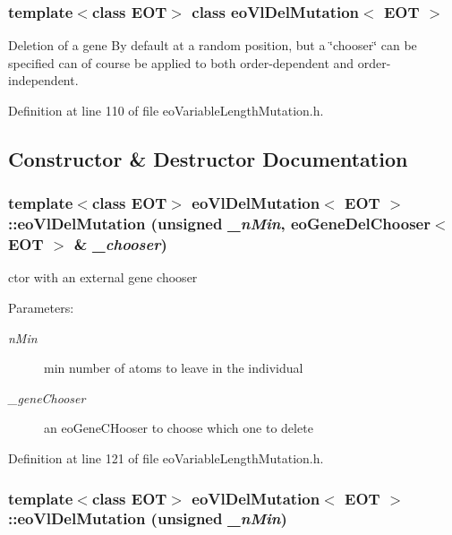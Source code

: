 \subsubsection*{template$<$class EOT$>$ class eo\-Vl\-Del\-Mutation$<$ EOT $>$}

Deletion of a gene By default at a random position, but a \char`\"{}chooser\char`\"{} can be specified can of course be applied to both order-dependent and order-independent. 



Definition at line 110 of file eo\-Variable\-Length\-Mutation.h.

\subsection{Constructor \& Destructor Documentation}
\subsubsection{\setlength{\rightskip}{0pt plus 5cm}template$<$class EOT$>$ {\bf eo\-Vl\-Del\-Mutation}$<$ {\bf EOT} $>$::{\bf eo\-Vl\-Del\-Mutation} (unsigned {\em \_\-n\-Min}, {\bf eo\-Gene\-Del\-Chooser}$<$ {\bf EOT} $>$ \& {\em \_\-chooser})\hspace{0.3cm}{\tt  [inline]}}\label{classeo_vl_del_mutation_a0}


ctor with an external gene chooser 

\begin{Desc}
\item[Parameters:]
\begin{description}
\item[{\em n\-Min}]min number of atoms to leave in the individual \item[{\em \_\-gene\-Chooser}]an eo\-Gene\-CHooser to choose which one to delete \end{description}
\end{Desc}


Definition at line 121 of file eo\-Variable\-Length\-Mutation.h.
\subsubsection{\setlength{\rightskip}{0pt plus 5cm}template$<$class EOT$>$ {\bf eo\-Vl\-Del\-Mutation}$<$ {\bf EOT} $>$::{\bf eo\-Vl\-Del\-Mutation} (unsigned {\em \_\-n\-Min})\hspace{0.3cm}{\tt  [inline]}}\label{classeo_vl_del_mutation_a1}


